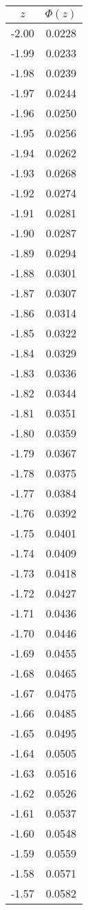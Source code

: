 \begin{tabular}{|c|c|}\hline
$z$ & $\Phi(z)$ \\ \hline
-2.00 & 0.0228\\
-1.99 & 0.0233\\
-1.98 & 0.0239\\
-1.97 & 0.0244\\
-1.96 & 0.0250\\
-1.95 & 0.0256\\
-1.94 & 0.0262\\
-1.93 & 0.0268\\
-1.92 & 0.0274\\
-1.91 & 0.0281\\
-1.90 & 0.0287\\
-1.89 & 0.0294\\
-1.88 & 0.0301\\
-1.87 & 0.0307\\
-1.86 & 0.0314\\
-1.85 & 0.0322\\
-1.84 & 0.0329\\
-1.83 & 0.0336\\
-1.82 & 0.0344\\
-1.81 & 0.0351\\
-1.80 & 0.0359\\
-1.79 & 0.0367\\
-1.78 & 0.0375\\
-1.77 & 0.0384\\
-1.76 & 0.0392\\
-1.75 & 0.0401\\
-1.74 & 0.0409\\
-1.73 & 0.0418\\
-1.72 & 0.0427\\
-1.71 & 0.0436\\
-1.70 & 0.0446\\
-1.69 & 0.0455\\
-1.68 & 0.0465\\
-1.67 & 0.0475\\
-1.66 & 0.0485\\
-1.65 & 0.0495\\
-1.64 & 0.0505\\
-1.63 & 0.0516\\
-1.62 & 0.0526\\
-1.61 & 0.0537\\
-1.60 & 0.0548\\
-1.59 & 0.0559\\
-1.58 & 0.0571\\
-1.57 & 0.0582\\

\end{tabular}

